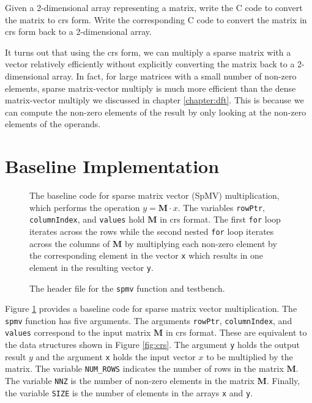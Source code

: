 \begin{exercise}
Given a 2-dimensional array representing a matrix, write the C code to convert the matrix to \gls{crs} form.  Write the corresponding C code to convert the matrix in \gls{crs} form back to a 2-dimensional array.
\end{exercise}

It turns out that using the \gls{crs} form, we can multiply a sparse matrix with a vector relatively efficiently without explicitly converting the matrix back to a 2-dimensional array.  In fact, for large matrices with a small number of non-zero elements, sparse matrix-vector multiply is much more efficient than the dense matrix-vector multiply we discussed in chapter \ref{chapter:dft}.  This is because we can compute the non-zero elements of the result by only looking at the non-zero elements of the operands. 

\section{Baseline Implementation}

\begin{figure}

\caption{  The baseline code for sparse matrix vector (SpMV) multiplication, which performs the operation $y = \mathbf{M} \cdot x$. The variables \lstinline{rowPtr}, \lstinline{columnIndex}, and \lstinline{values}  hold $\mathbf{M}$ in \gls{crs} format. The first \lstinline{for} loop iterates across the rows while the second nested \lstinline{for} loop iterates across the columns of $\mathbf{M}$ by multiplying each non-zero element by the corresponding element in the vector \lstinline{x} which results in one element in the resulting vector \lstinline{y}. }
\label{fig:spmv_arch1}
\end{figure}

\begin{figure}

\caption{ The header file for the \lstinline{spmv} function and testbench.  }
\label{fig:spmv.h}
\end{figure}

Figure \ref{fig:spmv_arch1} provides a baseline code for sparse matrix vector multiplication. The \lstinline{spmv} function has five arguments. The arguments \lstinline{rowPtr}, \lstinline{columnIndex}, and \lstinline{values} correspond to the input matrix $\mathbf{M}$ in \gls{crs} format. These are equivalent to the data structures shown in Figure \ref{fig:crs}. The argument \lstinline{y} holds the output result $y$ and the argument \lstinline{x} holds the input vector $x$ to be multiplied by the matrix.  The variable \lstinline{NUM_ROWS} indicates the number of rows in the matrix $\mathbf{M}$. The variable \lstinline{NNZ} is the number of non-zero elements in the matrix $\mathbf{M}$. Finally, the variable \lstinline{SIZE} is the number of elements in the arrays \lstinline{x} and \lstinline{y}.

